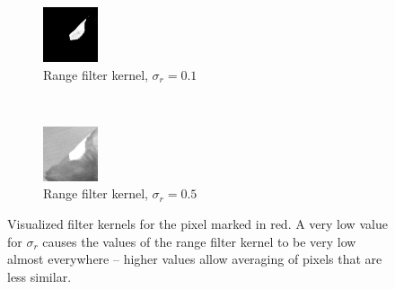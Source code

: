 \documentclass[a4spaper]{article}
\begin{document}
\begin{figure}[ht]
	\vspace{2mm}
	\begin{subfigure}[h]{0.4\textwidth}
		\centering
		\includegraphics[width=\textwidth]{jerry_kernel_range_0-1}
		\caption*{Range filter kernel, $\sigma_r = 0.1$}
	\end{subfigure}
	~ 
	\begin{subfigure}[h]{0.4\textwidth}
		\centering
		\includegraphics[width=\textwidth]{jerry_kernel_range_0-5}
		\caption*{Range filter kernel, $\sigma_r = 0.5$}
	\end{subfigure}
\caption{Visualized filter kernels for the pixel marked in red. A very low value for $\sigma_r$ causes the values of the range filter kernel to be very low almost everywhere -- higher values allow averaging of pixels that are less similar.}
\label{fig:kernel_small_range}
\end{figure}
\end{document}
